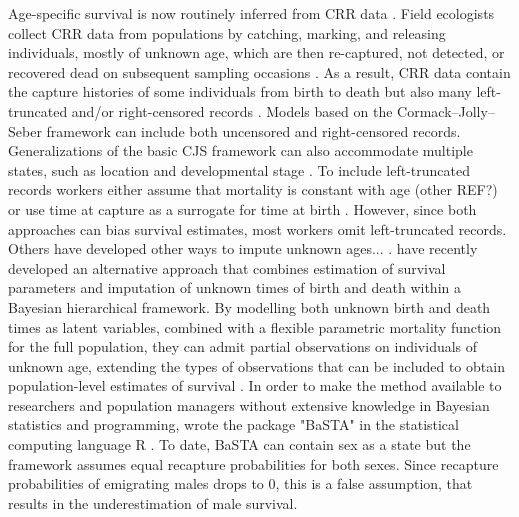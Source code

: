 Age-specific survival is now routinely inferred from CRR data \citep{Pollock:2000id}. Field ecologists collect CRR data from populations by catching, marking, and releasing individuals, mostly of unknown age, which are then re-captured, not detected, or recovered dead on subsequent sampling occasions \citep{Catchpole:1998th}. As a result, CRR data contain the capture histories of some individuals from birth to death but also many left-truncated and/or right-censored records \citep{Colchero:2012bf}. Models based on the Cormack--Jolly--Seber framework \citep[CSJ][]{Cormack:1964vi,Jolly:1965wt,Seber:1965tj} can include both uncensored and right-censored records. Generalizations of the basic CJS framework can also accommodate multiple states, such as location and developmental stage \citep{NeilArnason:1973kz,Schwarz:1993va,Lebreton:2002ju}. To include left-truncated records workers either assume that mortality is constant with age \citep{Aebischer:1990vp} (other REF?) or use time at capture as a surrogate for time at birth \citep{Crespin:2006jg,Reed:2008wa}. However, since both approaches can bias survival estimates, most workers omit left-truncated records.  Others have developed other ways to impute unknown ages... . \citet{Colchero:2012bf}  have recently developed an alternative approach that combines estimation of survival parameters and imputation of unknown times of birth and death within a Bayesian hierarchical framework. By modelling both unknown birth and death times as latent variables, combined with a flexible parametric mortality function for the full population, they can admit partial observations on individuals of unknown age, extending the types of observations that can be included to obtain population-level estimates of survival \citet{Colchero:2012bf}. In order to make the method available to researchers and population managers without extensive knowledge in Bayesian statistics and programming, \citep{Colchero:2012db} wrote the package "BaSTA" in the statistical computing language R \citep{Team:2012wf}. To date, BaSTA can contain sex as a state but the framework assumes equal recapture probabilities for both sexes. Since recapture probabilities of emigrating males drops to 0, this is a false assumption, that results in the underestimation of male survival.

